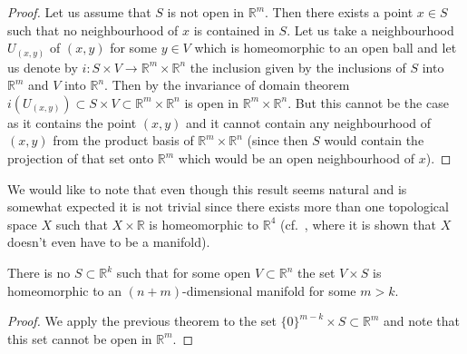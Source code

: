 \begin{proof} Let us assume that $S$ is not open in $\mathbb{R}^m$. Then there exists a point $x\in S$ such that no neighbourhood of $x$ is contained in $S$. Let us take a neighbourhood $U_{(x,y)}$ of $(x,y)$ for some $y\in V$ which is homeomorphic to an open ball and let us denote by $i\colon S\times V\rightarrow \mathbb{R}^m\times\mathbb{R}^n$ the inclusion given by the inclusions of $S$ into $\mathbb{R}^m$ and $V$ into $\mathbb{R}^n$. Then by the invariance of domain theorem $i(U_{(x,y)})\subset S\times V\subset \mathbb{R}^m\times\mathbb{R}^n$ is open in $\mathbb{R}^m\times\mathbb{R}^n$. But this cannot be the case as it contains the point $(x,y)$ and it cannot contain any neighbourhood of $(x,y)$ from the product basis of $\mathbb{R}^m\times\mathbb{R}^n$ (since then $S$ would contain the projection of that set onto $\mathbb{R}^m$ which would be an open neighbourhood of $x$).
\end{proof}

\begin{rem} We would like to note that even though this result seems natural and is somewhat expected it is not trivial since there exists more than one topological space $X$ such that $X\times\mathbb{R}$ is homeomorphic to $\mathbb{R}^4$ (cf.~\cite{B}, where it is shown that $X$ doesn't even have to be a manifold).
\end{rem}
\begin{cor}\label{prod2} There is no $S\subset\mathbb{R}^k$ such that for some open $V\subset\mathbb{R}^n$ the set $V\times S$ is homeomorphic to an $(n+m)$-dimensional manifold for some $m>k$.\end{cor}

\begin{proof} We apply the previous theorem to the set $\{0\}^{m-k}\times S\subset\mathbb{R}^m$ and note that this set cannot be open in $\mathbb{R}^m$.
\end{proof}

